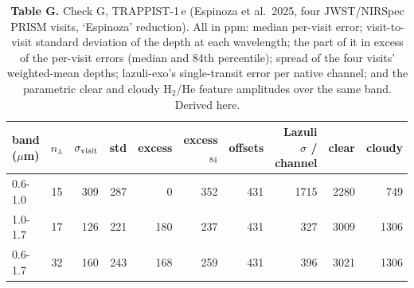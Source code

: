 \begin{table}[H]
\centering\footnotesize
\begin{tabular}{@{}lrrrrrrrrr@{}}
\toprule
\textbf{band ($\mu$m)} & \textbf{$n_\lambda$} & \textbf{$\sigma_{\rm visit}$} & \textbf{std} & \textbf{excess} & \textbf{excess$_{84}$} & \textbf{offsets} & \textbf{Lazuli $\sigma$ / channel} & \textbf{clear} & \textbf{cloudy} \\
\midrule
0.6-1.0 & 15 & 309 & 287 & 0 & 352 & 431 & 1715 & 2280 & 749 \\
1.0-1.7 & 17 & 126 & 221 & 180 & 237 & 431 & 327 & 3009 & 1306 \\
0.6-1.7 & 32 & 160 & 243 & 168 & 259 & 431 & 396 & 3021 & 1306 \\
\bottomrule
\end{tabular}
\caption*{\footnotesize\textbf{Table G.} Check G, TRAPPIST-1\,e (Espinoza et al.\ 2025, four JWST/NIRSpec PRISM visits, `Espinoza' reduction). All in ppm: median per-visit error; visit-to-visit standard deviation of the depth at each wavelength; the part of it in excess of the per-visit errors (median and 84th percentile); spread of the four visits' weighted-mean depths; lazuli-exo's single-transit error per native channel; and the parametric clear and cloudy H$_2$/He feature amplitudes over the same band. Derived here.}
\end{table}
